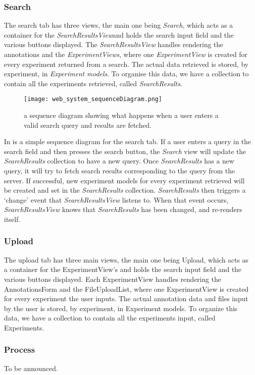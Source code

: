 \subsubsection{Search}
The search tab has three views, the main one being \textit{Search}, which acts as a container for the \textit{SearchResultsView}and holds the search input field and the various buttons displayed. The \textit{SearchResultsView} handles rendering the annotations and the \textit{ExperimentViews}, where one \textit{ExperimentView} is created for every experiment returned from a search. The actual data retrieved is stored, by experiment, in \textit{Experiment models}. To organise this data, we have a collection to contain all the experiments retrieved, called \textit{SearchResults}.
 
\begin{figure}[ht]
\centering
\texttt{[image: web\_system\_sequenceDiagram.png]}
\caption{\label{fig:web_system_sequenceDiagram}a sequence diagram showing what happens when a user enters a valid search query and results are fetched.}
\end{figure}

In  is a simple sequence diagram for the search tab. If a user enters a query in the search field and then presses the search button, the \textit{Search} view will update the \textit{SearchResults} collection to have a new query. Once \textit{SearchResults} has a new query, it will try to fetch search results corresponding to the query from the server. If successful, new experiment models for every experiment retrieved will be created and set in the \textit{SearchResults} collection. \textit{SearchResults} then triggers a ‘change’ event that \textit{SearchResultsView} listens to. When that event occurs, \textit{SearchResultsView} knows that \textit{SearchResults} has been changed, and re-renders itself.


\subsubsection{Upload}
The upload tab has three main views, the main one being Upload, which acts as a container for the ExperimentView’s and holds the search input field and the various buttons displayed. Each ExperimentView handles rendering the AnnotationsForm and the FileUploadList, where one ExperimentView is created for every experiment the user inputs. The actual annotation data and files input by the user is stored, by experiment, in Experiment models. To organize this data, we have a collection to contain all the experiments input, called Experiments.
\subsubsection{Process}
To be announced.